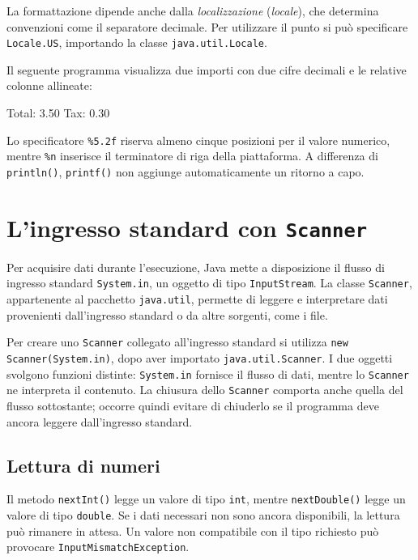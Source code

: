 La formattazione dipende anche dalla \emph{localizzazione}
(\emph{locale}), che determina convenzioni come il
separatore decimale. Per utilizzare il punto si può
specificare \texttt{Locale.US}, importando la classe
\texttt{java.util.Locale}.

\begin{example}
Il seguente programma visualizza due importi con
due cifre decimali e le relative colonne allineate:



\begin{unipdterminal}
Total: 3.50
Tax:   0.30
\end{unipdterminal}

Lo specificatore \lstinline|%5.2f| riserva almeno
cinque posizioni per il valore numerico, mentre
\lstinline|%n| inserisce il terminatore di riga
della piattaforma. A differenza di \texttt{println()},
\texttt{printf()} non aggiunge automaticamente
un ritorno a capo.
\end{example}

\section{L'ingresso standard con \texttt{Scanner}}
\label{sec:fi-java-scanner}

Per acquisire dati durante l'esecuzione, Java mette a
disposizione il flusso di ingresso standard \texttt{System.in},
un oggetto di tipo \texttt{InputStream}. La classe \texttt{Scanner},
appartenente al pacchetto \texttt{java.util}, permette di leggere
e interpretare dati provenienti dall'ingresso standard o da altre
sorgenti, come i file.

Per creare uno \texttt{Scanner} collegato all'ingresso
standard si utilizza \texttt{new Scanner(System.in)},
dopo aver importato \texttt{java.util.Scanner}.
I due oggetti svolgono funzioni distinte:
\texttt{System.in} fornisce il flusso di dati,
mentre lo \texttt{Scanner} ne interpreta il contenuto.
La chiusura dello \texttt{Scanner} comporta anche
quella del flusso sottostante; occorre quindi evitare
di chiuderlo se il programma deve ancora leggere
dall'ingresso standard.

\subsection{Lettura di numeri}
\label{sec:fi-java-scanner-numeri}

Il metodo \texttt{nextInt()} legge un valore di tipo
\texttt{int}, mentre \texttt{nextDouble()} legge un
valore di tipo \texttt{double}. Se i dati necessari
non sono ancora disponibili, la lettura può rimanere
in attesa. Un valore non compatibile con il tipo
richiesto può provocare \texttt{InputMismatchException}.

